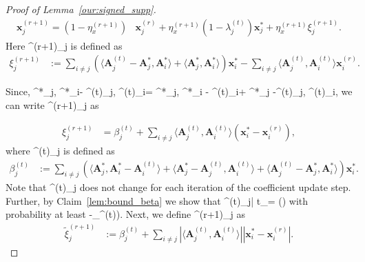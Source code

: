 \documentclass{article}
\def\[#1\]{{$#1$}}
\def\b#1{{\mathbf{#1}}}
\def\c#1{{\mathcal{#1}}}
\begin{document}
\begin{proof}[Proof of Lemma~\ref{our:signed_supp}]
	








		\begin{align}
		\label{iht_eq:r_th_iterate_xi}
		\b{x}_j^{(r+1)} =  (1 - \eta_{x}^{(r+1)}) &\b{x}_j^{(r)} + \eta_{x}^{(r+1)}(1 - \lambda^{(t)}_j) \b{x}_j^* + \eta_{x}^{(r+1)}\xi^{(r+1)}_{j} .
		\end{align}
		Here \[\xi^{(r+1)}_j\] is defined as 	 
		\begin{align*}
		\xi^{(r+1)}_{j}  &:= \textstyle\sum\limits_{i \neq j}( \langle \b{A}^{(t)}_j - \b{A}^{*}_j, \b{A}^*_i\rangle +  \langle \b{A}^{*}_j, \b{A}^*_i\rangle) \b{x}^*_i -\textstyle\sum\limits_{i \neq j} \langle \b{A}^{(t)}_j, \b{A}^{(t)}_i\rangle \b{x}_i^{(r)}.
		\end{align*}







		Since, \[\langle \b{A}^{*}_j, \b{A}^*_i\rangle  - \langle \b{A}^{(t)}_j, \b{A}^{(t)}_i\rangle = \langle \b{A}^{*}_j,  \b{A}^*_i - \b{A}^{(t)}_i\rangle  + \langle \b{A}^*_j -\b{A}^{(t)}_j, \b{A}^{(t)}_i\rangle\], we can write \[\xi^{(r+1)}_j\] as













		\begin{align}\label{eq:def_xi_r}
		\xi^{(r+1)}_{j} 
		
		& = \beta^{(t)}_j + \textstyle\sum\limits_{i \neq j}\langle \b{A}^{(t)}_j, \b{A}^{(t)}_i\rangle (\b{x}_i^*-\b{x}_i^{(r)}),
		\end{align}
		where \[\beta^{(t)}_j\] is defined as 
		\begin{align}\label{eq:beta_t}
		\beta^{(t)}_j
		& := \textstyle\sum\limits_{i \neq j} (\langle \b{A}^{*}_j,  \b{A}^*_i - \b{A}^{(t)}_i\rangle  + \langle \b{A}^*_j -\b{A}^{(t)}_j, \b{A}^{(t)}_i\rangle + \langle \b{A}^{(t)}_j - \b{A}^{*}_j, \b{A}^*_i\rangle) \b{x}_i^*.
		\end{align}
		Note that \[\beta^{(t)}_j\] does not change for each iteration \[r\] of the coefficient update step. Further, by Claim~\ref{lem:bound_beta} we show that \[|\beta^{(t)}_j| \leq t_\beta = \c{O}()\] with probability at least \[(1-\delta_{\beta}^{(t)})\]. Next, we define \[\tilde{\xi}^{(r+1)}_{j}\] as
		\begin{align}\label{eq:xi_r_abs}
		\tilde{\xi}^{(r+1)}_{j} 
		& := \beta^{(t)}_j + \textstyle\sum\limits_{i \neq j}|\langle \b{A}^{(t)}_j, \b{A}^{(t)}_i\rangle| |\b{x}_i^{*} - \b{x}_i^{(r)}|.
	

\end{align}
\end{proof}
\end{document}
